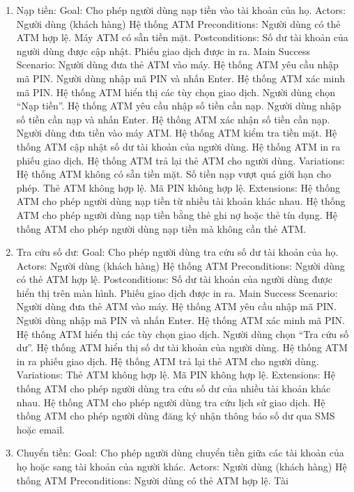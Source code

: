 \documentclass[
]{article}
\author{}
\date{}
\begin{document}
\begin{enumerate}
\def\labelenumi{\arabic{enumi}.}
\item
  Nạp tiền: Goal: Cho phép người dùng nạp tiền vào tài khoản của họ.
  Actors: Người dùng (khách hàng) Hệ thống ATM Preconditions: Người dùng
  có thẻ ATM hợp lệ. Máy ATM có sẵn tiền mặt. Postconditions: Số dư tài
  khoản của người dùng được cập nhật. Phiếu giao dịch được in ra. Main
  Success Scenario: Người dùng đưa thẻ ATM vào máy. Hệ thống ATM yêu cầu
  nhập mã PIN. Người dùng nhập mã PIN và nhấn Enter. Hệ thống ATM xác
  minh mã PIN. Hệ thống ATM hiển thị các tùy chọn giao dịch. Người dùng
  chọn ``Nạp tiền''. Hệ thống ATM yêu cầu nhập số tiền cần nạp. Người
  dùng nhập số tiền cần nạp và nhấn Enter. Hệ thống ATM xác nhận số tiền
  cần nạp. Người dùng đưa tiền vào máy ATM. Hệ thống ATM kiểm tra tiền
  mặt. Hệ thống ATM cập nhật số dư tài khoản của người dùng. Hệ thống
  ATM in ra phiếu giao dịch. Hệ thống ATM trả lại thẻ ATM cho người
  dùng. Variations: Hệ thống ATM không có sẵn tiền mặt. Số tiền nạp vượt
  quá giới hạn cho phép. Thẻ ATM không hợp lệ. Mã PIN không hợp lệ.
  Extensions: Hệ thống ATM cho phép người dùng nạp tiền từ nhiều tài
  khoản khác nhau. Hệ thống ATM cho phép người dùng nạp tiền bằng thẻ
  ghi nợ hoặc thẻ tín dụng. Hệ thống ATM cho phép người dùng nạp tiền mà
  không cần thẻ ATM.
\item
  Tra cứu số dư: Goal: Cho phép người dùng tra cứu số dư tài khoản của
  họ. Actors: Người dùng (khách hàng) Hệ thống ATM Preconditions: Người
  dùng có thẻ ATM hợp lệ. Postconditions: Số dư tài khoản của người dùng
  được hiển thị trên màn hình. Phiếu giao dịch được in ra. Main Success
  Scenario: Người dùng đưa thẻ ATM vào máy. Hệ thống ATM yêu cầu nhập mã
  PIN. Người dùng nhập mã PIN và nhấn Enter. Hệ thống ATM xác minh mã
  PIN. Hệ thống ATM hiển thị các tùy chọn giao dịch. Người dùng chọn
  ``Tra cứu số dư''. Hệ thống ATM hiển thị số dư tài khoản của người
  dùng. Hệ thống ATM in ra phiếu giao dịch. Hệ thống ATM trả lại thẻ ATM
  cho người dùng. Variations: Thẻ ATM không hợp lệ. Mã PIN không hợp lệ.
  Extensions: Hệ thống ATM cho phép người dùng tra cứu số dư của nhiều
  tài khoản khác nhau. Hệ thống ATM cho phép người dùng tra cứu lịch sử
  giao dịch. Hệ thống ATM cho phép người dùng đăng ký nhận thông báo số
  dư qua SMS hoặc email.
\item
  Chuyển tiền: Goal: Cho phép người dùng chuyển tiền giữa các tài khoản
  của họ hoặc sang tài khoản của người khác. Actors: Người dùng (khách
  hàng) Hệ thống ATM Preconditions: Người dùng có thẻ ATM hợp lệ. Tài

\end{enumerate}
\end{document}
